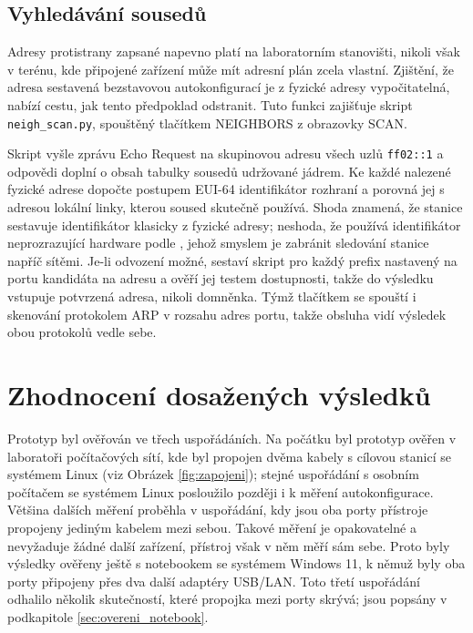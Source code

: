 \subsection{Vyhledávání sousedů}
\label{sec:vyhledavani_sousedu}

Adresy protistrany zapsané napevno platí na laboratorním stanovišti, nikoli však v terénu, kde připojené zařízení může mít adresní plán zcela vlastní. Zjištění, že adresa sestavená bezstavovou autokonfigurací je z fyzické adresy vypočitatelná, nabízí cestu, jak tento předpoklad odstranit. Tuto funkci zajišťuje skript \texttt{neigh\_scan.py}, spouštěný tlačítkem NEIGHBORS z obrazovky SCAN.

Skript vyšle zprávu Echo Request na skupinovou adresu všech uzlů \texttt{ff02::1} a odpovědi doplní o obsah tabulky sousedů udržované jádrem. Ke každé nalezené fyzické adrese dopočte postupem EUI-64 identifikátor rozhraní a porovná jej s adresou lokální linky, kterou soused skutečně používá. Shoda znamená, že stanice sestavuje identifikátor klasicky z fyzické adresy; neshoda, že používá identifikátor neprozrazující hardware podle \cite{rfc7217}, jehož smyslem je zabránit sledování stanice napříč sítěmi. Je-li odvození možné, sestaví skript pro každý prefix nastavený na portu kandidáta na adresu a ověří jej testem dostupnosti, takže do výsledku vstupuje potvrzená adresa, nikoli domněnka. Týmž tlačítkem se spouští i skenování protokolem ARP v rozsahu adres portu, takže obsluha vidí výsledek obou protokolů vedle sebe.

\section{Zhodnocení dosažených výsledků}
\label{sec:zhodnoceni}

Prototyp byl ověřován ve třech uspořádáních. Na počátku byl prototyp ověřen v laboratoři počítačových sítí, kde byl propojen dvěma kabely s cílovou stanicí se systémem Linux (viz Obrázek \ref{fig:zapojeni}); stejné uspořádání s osobním počítačem se systémem Linux posloužilo později i k měření autokonfigurace. Většina dalších měření proběhla v uspořádání, kdy jsou oba porty přístroje propojeny jediným kabelem mezi sebou. Takové měření je opakovatelné a nevyžaduje žádné další zařízení, přístroj však v něm měří sám sebe. Proto byly výsledky ověřeny ještě s notebookem se systémem Windows 11, k němuž byly oba porty připojeny přes dva další adaptéry USB/LAN. Toto třetí uspořádání odhalilo několik skutečností, které propojka mezi porty skrývá; jsou popsány v podkapitole \ref{sec:overeni_notebook}.

